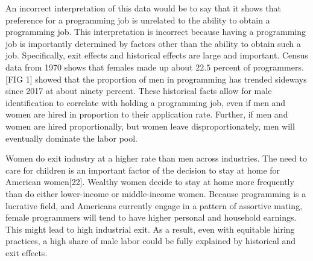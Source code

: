 \documentclass[review]{elsarticle}
\begin{document}
An incorrect interpretation of this data would be to say that it shows
that preference for a programming job is unrelated to the ability to obtain a programming job.
This interpretation is incorrect because having a programming job
is importantly determined by factors other than the ability to obtain such a job.
Specifically, exit effects and historical effects are large and important.
Census data from 1970 shows that females made up about $22.5$ percent of programmers\cite{gilchrist1974enumerating}.
[FIG 1] showed that the proportion of men in programming has trended sideways since 2017 at about ninety percent.
These historical facts allow for male identification to correlate with holding a programming job,
even if men and women are hired in proportion to their application rate.
Further, if men and women are hired proportionally, but women leave disproportionately,
men will eventually dominate the labor pool.

Women do exit industry at a higher rate than men across industries.
The need to care for children is an important factor of the decision to stay at home
for American women[22].
Wealthy women decide to stay at home more frequently than do either lower-income
or middle-income women.
Because programming is a lucrative field,
and Americans currently engage in a pattern of assortive mating,
female programmers will tend to have higher personal and household earnings.
This might lead to high industrial exit.
As a result, even with equitable hiring practices,
a high share of male labor could be fully explained by historical and exit effects.





\end{document}
